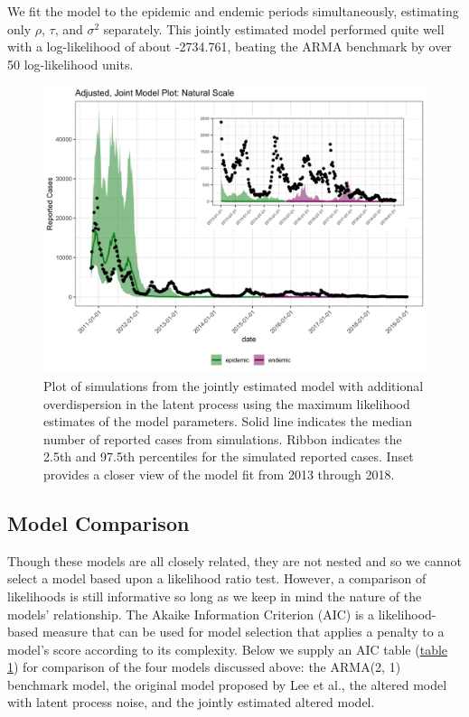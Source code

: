 \documentclass[12pt]{article}
\begin{document}
  We fit the model to the epidemic and endemic periods simultaneously, estimating only $\rho$, $\tau$, and $\sigma^2$ separately. This jointly estimated model performed quite well with a log-likelihood of about -2734.761, beating the ARMA benchmark by over 50 log-likelihood units.
        \begin{figure}[H]
          \centering
          \includegraphics[width=150mm]{joint_inset.png}
          \caption{Plot of simulations from the jointly estimated model with additional overdispersion in the latent process using the maximum likelihood estimates of the model parameters. Solid line indicates the median number of reported cases from simulations. Ribbon indicates the 2.5th and 97.5th percentiles for the simulated reported cases. Inset provides a closer view of the model fit from 2013 through 2018.}
          \label{fig:4}
        \end{figure}

\subsection{Model Comparison}

 Though these models are all closely related, they are not nested and so we cannot select a model based upon a likelihood ratio test. However, a comparison of likelihoods is still informative so long as we keep in mind the nature of the models' relationship. The Akaike Information Criterion (AIC) is a likelihood-based measure that can be used for model selection that applies a penalty to a model's score according to its complexity. Below we supply an AIC table (\hyperref[tab:1]{table 1}) for comparison of the four models discussed above: the ARMA(2, 1) benchmark model, the original model proposed by Lee et al., the altered model with latent process noise, and the jointly estimated altered model. 
\end{document}
